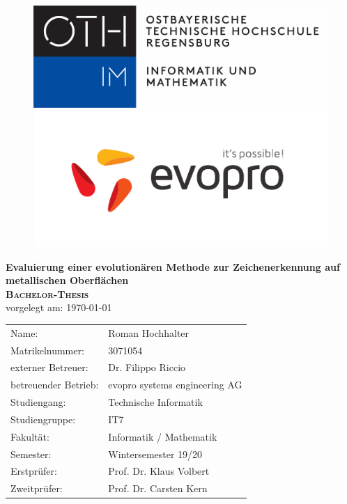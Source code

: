 \begin{titlepage}
		\begin{figure}%
			\begin{minipage}{0.48\textwidth}
				
				\includegraphics[width=0.6\linewidth]{oth-regensburg-logo}
			\end{minipage}
			\hfill
			\begin{minipage}{0.48\textwidth}
				\flushright
				\includegraphics[width=0.5\linewidth]{evopro_logo_cmyk}
			\end{minipage}
		\end{figure}
		\vspace*{1cm}
		\begin{center}
			\huge \textbf{\textsf{Evaluierung einer evolutionären Methode zur 
			Zeichenerkennung auf metallischen Oberflächen}} \\
			\vspace{4cm}
			\huge\textbf{\textsc{Bachelor-Thesis}} \\
			\vspace{1cm}
			\normalsize{vorgelegt am: \today} \\
			\vspace{3cm}
			\normalsize{
				\begin{tabular}{ll}
					Name: & {Roman Hochhalter} \\
					Matrikelnummer: & {3071054} \\
					externer Betreuer: & Dr. Filippo Riccio \\
					betreuender Betrieb: & evopro systems engineering AG \\
					Studiengang: & Technische Informatik \\
					Studiengruppe: & IT7 \\
					Fakultät: & Informatik / Mathematik \\
					Semester: & Wintersemester 19/20 \\
					Erstprüfer: & {Prof. Dr. Klaus Volbert} \\
					Zweitprüfer: & {Prof. Dr. Carsten Kern} \\
				\end{tabular}
			}
		\end{center}
\end{titlepage}

\cleardoublepage